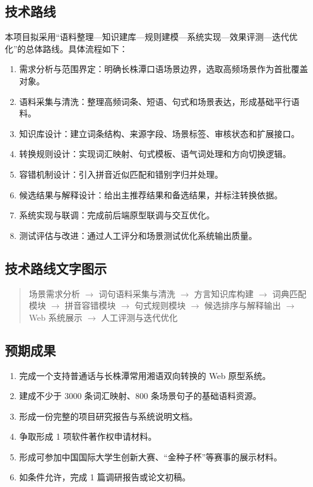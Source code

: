 \documentclass[12pt,a4paper]{ctexart}
\begin{document}
\subsection{技术路线}

本项目拟采用“语料整理—知识建库—规则建模—系统实现—效果评测—迭代优化”的总体路线。具体流程如下：

\begin{enumerate}
  \item 需求分析与范围界定：明确长株潭口语场景边界，选取高频场景作为首批覆盖对象。
  \item 语料采集与清洗：整理高频词条、短语、句式和场景表达，形成基础平行语料。
  \item 知识库设计：建立词条结构、来源字段、场景标签、审核状态和扩展接口。
  \item 转换规则设计：实现词汇映射、句式模板、语气词处理和方向切换逻辑。
  \item 容错机制设计：引入拼音近似匹配和错别字归并处理。
  \item 候选结果与解释设计：给出主推荐结果和备选结果，并标注转换依据。
  \item 系统实现与联调：完成前后端原型联调与交互优化。
  \item 测试评估与改进：通过人工评分和场景测试优化系统输出质量。
\end{enumerate}

\subsection{技术路线文字图示}

\begin{quote}
场景需求分析 $\rightarrow$ 词句语料采集与清洗 $\rightarrow$ 方言知识库构建 $\rightarrow$ 词典匹配模块 $\rightarrow$ 拼音容错模块 $\rightarrow$ 句式规则模块 $\rightarrow$ 候选排序与解释输出 $\rightarrow$ Web 系统展示 $\rightarrow$ 人工评测与迭代优化
\end{quote}

\subsection{预期成果}

\begin{enumerate}
  \item 完成一个支持普通话与长株潭常用湘语双向转换的 Web 原型系统。
  \item 建成不少于 3000 条词汇映射、800 条场景句子的基础语料资源。
  \item 形成一份完整的项目研究报告与系统说明文档。
  \item 争取形成 1 项软件著作权申请材料。
  \item 形成可参加中国国际大学生创新大赛、“金种子杯”等赛事的展示材料。
  \item 如条件允许，完成 1 篇调研报告或论文初稿。
\end{enumerate}
\end{document}
